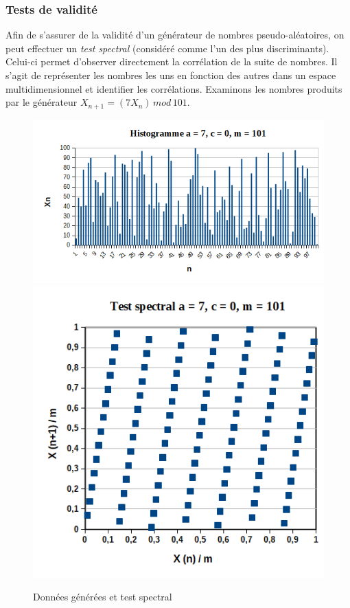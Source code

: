 \documentclass{scrartcl}
\begin{document}
\subsubsection{Tests de validité}\label{ss:spectral}
Afin de s'assurer de la validité d'un générateur de nombres pseudo-aléatoires,
on peut effectuer un \textit{ test spectral} (considéré comme l'un des plus
discriminants). Celui-ci permet d'observer directement la corrélation de la
suite de nombres.  Il s'agit de représenter les nombres les uns en fonction des
autres dans un espace multidimensionnel et identifier les corrélations.
Examinons les nombres produits par le générateur
$X_{n+1} =(7 X_{n})\, mod\, 101$.
\begin{figure}
  \begin{center}
    \includegraphics[scale=0.6]{img/histo7Xn[101].png}
    \hspace{0.1\textwidth}
    \includegraphics[scale=0.6]{img/a7m101.png}
  \end{center}
  \caption{Données générées et test spectral}
  \label{fig:DGTS}
\end{figure}
\end{document}
